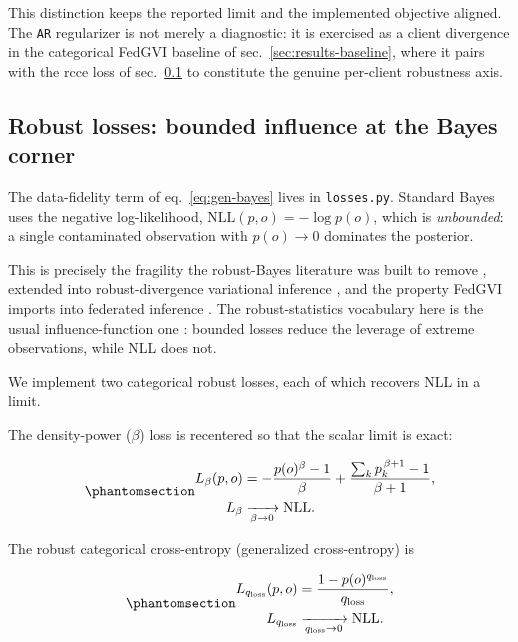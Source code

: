 \documentclass[
  english,
]{article}
\theoremstyle{plain}
\theoremstyle{definition}
\theoremstyle{remark}
\theoremstyle{definition}
\begin{document}
This distinction keeps the reported limit and the implemented objective
aligned. The \texttt{AR} regularizer is not merely a diagnostic: it is
exercised as a client divergence in the categorical FedGVI baseline of
sec.~\ref{sec:results-baseline}, where it pairs with the rcce loss of
sec.~\ref{sec:method-losses} to constitute the genuine per-client
robustness axis.

\subsection{Robust losses: bounded influence at the Bayes
corner}\label{sec:method-losses}

The data-fidelity term of eq.~\ref{eq:gen-bayes} lives in
\texttt{losses.py}. Standard Bayes uses the negative log-likelihood,
\(\mathrm{NLL}(p, o) = -\log p(o)\), which is \emph{unbounded}: a single
contaminated observation with \(p(o)\to 0\) dominates the posterior.

This is precisely the fragility the robust-Bayes literature was built to
remove
\citep{basu1998robust, fujisawa2008robust, ghosh2015robust, zhang2018generalized},
extended into robust-divergence variational inference
\citep{futami2018robustvi}, and the property FedGVI imports into
federated inference \citep{mildner2025fedgvi}. The robust-statistics
vocabulary here is the usual influence-function one
\citep{huber2009robust}: bounded losses reduce the leverage of extreme
observations, while NLL does not.

We implement two categorical robust losses, each of which recovers NLL
in a limit.

The density-power (\(\beta\)) loss
\citep{basu1998robust, fujisawa2008robust, ghosh2015robust, futami2018robustvi}
is recentered so that the scalar limit is exact:

\begin{equation}\protect\phantomsection\label{eq:beta-loss}{\begin{aligned}
L_\beta(p, o)
&= -\frac{p(o)^\beta - 1}{\beta}
   + \frac{\sum_k p_k^{\,\beta+1} - 1}{\beta+1},\\
L_\beta
&\xrightarrow[\beta\to 0]{} \mathrm{NLL}.
\end{aligned}}\end{equation}

The robust categorical cross-entropy (generalized cross-entropy)
\citep{zhang2018generalized} is

\begin{equation}\protect\phantomsection\label{eq:rcce-loss}{\begin{aligned}
L_{q_{\text{loss}}}(p, o)
&= \frac{1 - p(o)^{q_{\text{loss}}}}{q_{\text{loss}}},\\
L_{q_{\text{loss}}}
&\xrightarrow[q_{\text{loss}}\to 0]{} \mathrm{NLL}.
\end{aligned}}\end{equation}
\end{document}
